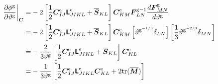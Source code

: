 \documentclass[10pt,letterpaper,oneside]{report}
\newcommand{\ten}[1]{\mbox{\boldmath $#1$}{}}
\newcommand{\tenf}[1]{\mbox{{\sffamily{\bfseries {#1}}}}}
\newcommand{\scas}[1]{\mbox{{\scriptsize{${\rm{#1}}$}}}{}}
\newcommand{\tens}[1]{\mbox{\boldmath{\scriptsize{$#1$}}}{}}
\begin{document}
\begin{align}
\left. \frac{\partial \phi^{\scas{g}}}{\partial \vartheta^{\scas{g}}} \right|_{\tens{C}}
=& - 2 \left[ \frac{1}{2} \ten{C}^{\scas{e}}_{IJ} \tenf{L}^{\scas{e}}_{JIKL} + \overline{\ten{S}}_{KL} \right] \ten{C}^{\scas{e}}_{KM} \ten{F}^{\scas{g}-1}_{LN} \frac{ d \ten{F}^{\scas{g}}_{MN} }{ d \vartheta^{\scas{g}} }
\notag \\
=& - 2 \left[ \frac{1}{2} \ten{C}^{\scas{e}}_{IJ} \tenf{L}^{\scas{e}}_{JIKL} + \overline{\ten{S}}_{KL} \right] \ten{C}^{\scas{e}}_{KM} \left[ \vartheta^{\scas{g}^{-1/3}} \delta_{LN} \right] \left[ \frac{1}{3} \vartheta^{\scas{g}^{-2/3}} \delta_{MN}  \right]
\notag \\
=& - \frac{2}{3 \vartheta^{\scas{g}}}  \left[ \frac{1}{2} \ten{C}^{\scas{e}}_{IJ} \tenf{L}^{\scas{e}}_{JIKL} + \overline{\ten{S}}_{KL} \right] \ten{C}^{\scas{e}}_{KL} 
\notag \\
=& - \frac{1}{3 \vartheta^{\scas{g}}}  \left[ \frac{1}{2} \ten{C}^{\scas{e}}_{IJ} \tenf{L}^{\scas{e}}_{JIKL} \ten{C}^{\scas{e}}_{KL} + 2 \text{tr} ( \overline{\ten{M}} ) \right] 
\end{align}
\end{document}
